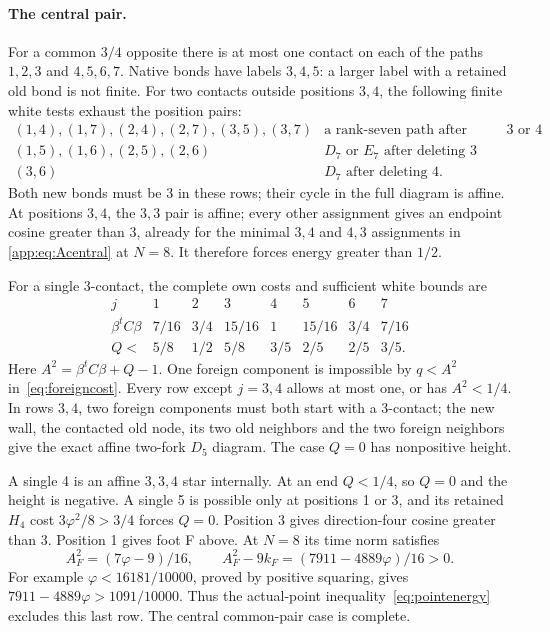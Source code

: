 \documentclass[11pt]{article}
\theoremstyle{definition}
\theoremstyle{remark}
\newcommand{\ph}{\varphi}
\begin{document}
\paragraph{The central pair.}
For a common $3/4$ opposite there is at most one contact on
each of the paths $1,2,3$ and $4,5,6,7$. Native bonds have labels
$3,4,5$: a larger label with a retained old bond is not finite.
For two contacts outside positions $3,4$, the following finite
white tests exhaust the position pairs:
\[
\begin{array}{c|l}
 (1,4),(1,7),(2,4),(2,7),(3,5),(3,7)&
       \text{a rank-seven path after deleting }3\text{ or }4\\
 (1,5),(1,6),(2,5),(2,6)&D_7\text{ or }E_7\text{ after deleting }3\\
 (3,6)&D_7\text{ after deleting }4 .
\end{array}
\]
Both new bonds must be 3 in these rows; their cycle in the full
diagram is affine. At positions $3,4$, the $3,3$ pair is affine;
every other assignment gives an endpoint cosine greater than 3,
already for the minimal $3,4$ and $4,3$ assignments in
\eqref{app:eq:Acentral} at $N=8$. It therefore forces energy greater
than $1/2$.

For a single 3-contact, the complete own costs and sufficient
white bounds are
\[
\begin{array}{c|rrrrrrr}
 j&1&2&3&4&5&6&7\\\hline
 \beta^t C\beta&7/16&3/4&15/16&1&15/16&3/4&7/16\\
 Q<&5/8&1/2&5/8&3/5&2/5&2/5&3/5 .
\end{array}
\]
Here $A^2=\beta^t C\beta+Q-1$. One foreign component is
impossible by $q<A^2$ in~\eqref{eq:foreigncost}. Every row except
$j=3,4$ allows at most one, or has $A^2<1/4$. In rows $3,4$,
two foreign components must both start with a 3-contact; the
new wall, the contacted old node, its two old neighbors and the
two foreign neighbors give the exact affine two-fork $D_5$
diagram. The case $Q=0$ has nonpositive height.

A single 4 is an affine $3,3,4$ star internally. At an end
$Q<1/4$, so $Q=0$ and the height is negative. A single 5 is
possible only at positions 1 or 3, and its retained $H_4$ cost
$3\ph^2/8>3/4$ forces $Q=0$. Position 3 gives direction-four
cosine greater than 3. Position 1 gives foot F above. At $N=8$
its time norm satisfies
\[
 A_F^2=(7\ph-9)/16,\qquad
 A_F^2-9k_F=(7911-4889\ph)/16>0.
\]
For example $\ph<16181/10000$, proved by positive squaring,
gives $7911-4889\ph>1091/10000$. Thus the actual-point
inequality~\eqref{eq:pointenergy} excludes this last row.
The central common-pair case is complete.
\end{document}
